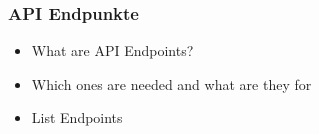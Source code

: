 \subsubsection{API Endpunkte}
\label{ssub:api_endpunkte}
  \begin{itemize}
    \item What are API Endpoints?
    \item Which ones are needed and what are they for
    \item List Endpoints
  \end{itemize}
  
